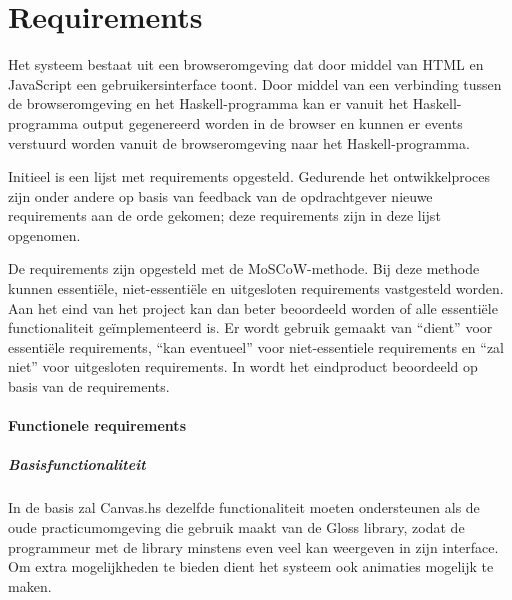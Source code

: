 \chapter{Requirements} \label{hoofdstuk:requirements}


Het systeem bestaat uit een browseromgeving dat door middel van HTML en JavaScript een gebruikersinterface toont. Door middel van een verbinding tussen de browseromgeving en het Haskell-programma kan er vanuit het Haskell-programma output gegenereerd worden in de browser en kunnen er events verstuurd worden vanuit de browseromgeving naar het Haskell-programma.

Initieel is een lijst met requirements opgesteld. Gedurende het ontwikkelproces zijn onder andere op basis van feedback van de opdrachtgever nieuwe requirements aan de orde gekomen; deze requirements zijn in deze lijst opgenomen.

De requirements zijn opgesteld met de MoSCoW-methode. Bij deze methode kunnen essenti\"ele, niet-essenti\"ele en uitgesloten requirements vastgesteld worden. Aan het eind van het project kan dan beter beoordeeld worden of alle essenti\"ele functionaliteit ge\"implementeerd is. Er wordt gebruik gemaakt van ``dient'' voor essenti\"ele requirements, ``kan eventueel'' voor niet-essentiele requirements en ``zal niet'' voor uitgesloten requirements. In  wordt het eindproduct beoordeeld op basis van de requirements.

\subsubsection{Functionele requirements}
\paragraph{Basisfunctionaliteit} In de basis zal Canvas.hs dezelfde functionaliteit moeten ondersteunen als de oude practicumomgeving die gebruik maakt van de Gloss library, zodat de programmeur met de library minstens even veel kan weergeven in zijn interface. Om extra mogelijkheden te bieden dient het systeem ook animaties mogelijk te maken.

